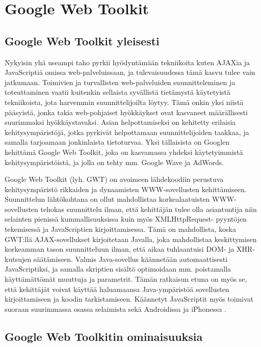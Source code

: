 \section{Google Web Toolkit}

\subsection{Google Web Toolkit yleisesti}

Nykyisin yhä useampi taho pyrkii hyödyntämään tekniikoita kuten AJAXia ja JavaScriptiä omissa web-palveluissaan, ja tulevaisuudessa tämä kasvu tulee vain jatkumaan. Toimivien ja 
turvallisten  web-palveluiden suunnitteleminen ja toteuttaminen vaatii kuitenkin sellaista syvällistä tietämystä käytetyistä tekniikoista, jota harvemmin suunnittelijoilta löytyy. 
Tämä onkin yksi  niistä pääsyistä, jonka takia web-pohjaiset hyökkäykset ovat kasvaneet määrällisesti suurimmaksi hyökkäystavaksi. Asian helpottamiseksi on kehitetty erilaisia 
kehitysympäristöjä, jotka pyrkivät helpottamaan suunnittelijoiden taakkaa, ja samalla tarjoamaan jonkinlaista tietoturvaa. Yksi tällaisista on Googlen kehittämä Google Web Toolkit, 
joka on kasvamassa yhdeksi käytetyimmistä kehitysympäristöistä, ja jolla on tehty mm. Google Wave ja AdWords.

Google Web Toolkit (lyh. GWT) on avoimeen lähdekoodiin perustuva kehitysympäristö rikkaiden ja dynaamisten WWW-sovellusten kehittämiseen. Suunnittelun lähtökohtana on ollut mahdollistaa
korkealaatuisten WWW-sovellusten tehokas suunnittelu ilman, että kehittäjän tulee olla asiantuntija niin selainten pienissä kummallisuuksissa kuin myös XMLHttpRequest- pyyntöjen
tekemisessä ja JavaScriptien kirjoittamisessa. Tämä on mahdollista, koska GWT:llä AJAX-sovellukset kirjoitetaan Javalla, joka mahdollistaa keskittymisen korkeamman tason suunnitteluun 
ilman, että aikaa tuhlaantuisi DOM- ja XHR-kutsujen säätämiseen. Valmis Java-sovellus käännetään automaattisesti JavaScriptiksi, ja samalla skriptien sisältö optimoidaan mm.
poistamalla käyttämättömät muuttuja ja parametrit. Tämän ratkaisun etuna on myös se, että kehittäjät voivat käyttää haluamaansa Java-ympäristöä sovellusten kirjoittamiseen ja koodin 
tarkistamiseen. Käännetyt JavaScriptit myös toimivat suoraan suurimmassa osassa selaimista sekä Androidissa ja iPhonessa \cite{GWT}.

\subsection{Google Web Toolkitin ominaisuuksia}

